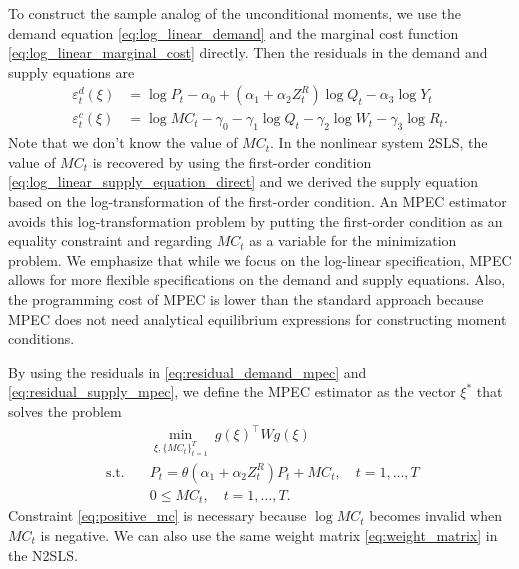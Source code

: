 \documentclass[11pt, a4paper]{article}
\begin{document}
To construct the sample analog of the unconditional moments, we use the demand equation \eqref{eq:log_linear_demand} and the marginal cost function \eqref{eq:log_linear_marginal_cost} directly.
Then the residuals in the demand and supply equations are
\begin{align}
    \varepsilon_t^d(\xi) & =  \log P_{t} - \alpha_0 + (\alpha_1 + \alpha_2 Z^{R}_{t}) \log Q_t - \alpha_3 \log Y_t \label{eq:residual_demand_mpec}\\
    \varepsilon_t^c(\xi) & = \log MC_{t} - \gamma_0 - \gamma_1 \log Q_t -  \gamma_2 \log W_{t} - \gamma_3 \log R_t \label{eq:residual_supply_mpec}.
\end{align}
Note that we don't know the value of $MC_{t}$.
In the nonlinear system 2SLS, the value of $MC_{t}$ is recovered by using the first-order condition \eqref{eq:log_linear_supply_equation_direct} and we derived the supply equation based on the log-transformation of the first-order condition.
An MPEC estimator avoids this log-transformation problem by putting the first-order condition as an equality constraint and regarding $MC_t$ as a variable for the minimization problem.
We emphasize that while we focus on the log-linear specification, MPEC allows for more flexible specifications on the demand and supply equations.
Also, the programming cost of MPEC is lower than the standard approach because MPEC does not need analytical equilibrium expressions for constructing moment conditions.

By using the residuals in \eqref{eq:residual_demand_mpec} and \eqref{eq:residual_supply_mpec}, we define the MPEC estimator as the vector $\xi^{*}$ that solves the problem
\begin{align}
    &\min_{\xi, \{MC_t\}_{t=1}^T}\ g(\xi)^\top W g(\xi)\\
    \text{ s.t.}\quad & P_t = \theta (\alpha_1 + \alpha_2 Z^{R}_{t})P_t + MC_t,\quad t = 1,\ldots, T\\
    & 0 \le MC_t,\quad t = 1,\ldots, T\label{eq:positive_mc}.
\end{align}
Constraint \eqref{eq:positive_mc} is necessary because $\log MC_t$ becomes invalid when $MC_t$ is negative.
We can also use the same weight matrix \eqref{eq:weight_matrix} in the N2SLS.
\end{document}
